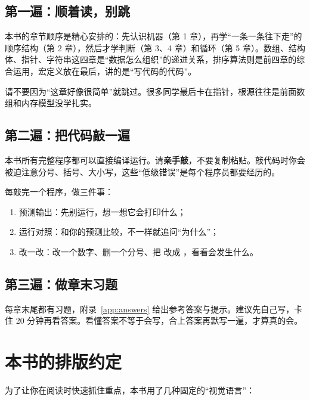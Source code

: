 \subsection*{第一遍：顺着读，别跳}

本书的章节顺序是精心安排的：先认识机器（第 1 章），再学“一条一条往下走”的顺序结构（第 2 章），然后才学判断（第 3、4 章）和循环（第 5 章）。数组、结构体、指针、字符串这四章是“数据怎么组织”的递进关系，排序算法则是前四章的综合运用，宏定义放在最后，讲的是“写代码的代码”。

请不要因为“这章好像很简单”就跳过。很多同学最后卡在指针，根源往往是前面数组和内存模型没学扎实。

\subsection*{第二遍：把代码敲一遍}

本书所有完整程序都可以直接编译运行。请\textbf{亲手敲}，不要复制粘贴。敲代码时你会被迫注意分号、括号、大小写，这些“低级错误”是每个程序员都要经历的。

每敲完一个程序，做三件事：

\begin{enumerate}
  \item 预测输出：先别运行，想一想它会打印什么；
  \item 运行对照：和你的预测比较，不一样就追问“为什么”；
  \item 改一改：改一个数字、删一个分号、把 \code{<} 改成 \code{<=}，看看会发生什么。
\end{enumerate}

\subsection*{第三遍：做章末习题}

每章末尾都有习题，附录~\ref{app:answers} 给出参考答案与提示。建议先自己写，卡住 20 分钟再看答案。看懂答案不等于会写，合上答案再默写一遍，才算真的会。

\section*{本书的排版约定}

为了让你在阅读时快速抓住重点，本书用了几种固定的“视觉语言”：

